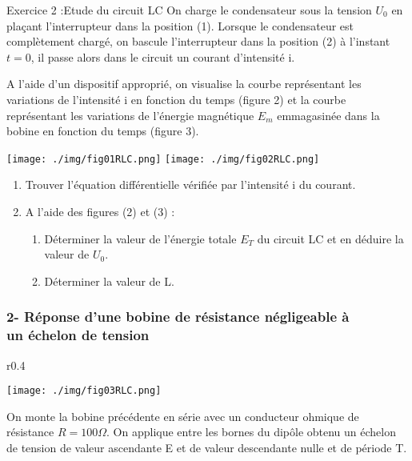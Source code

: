 \documentclass[12pt, french]{article}
\begin{document}
\begin{Box2}{Exercice 2 :Etude du circuit LC}
On charge le condensateur sous la tension $U_0$ en plaçant l'interrupteur dans la position (1).
Lorsque le condensateur est complètement chargé, on bascule l'interrupteur dans la position (2) à l'instant $t = 0$, il passe alors dans le circuit un courant d'intensité i.

A l'aide d'un dispositif approprié, on visualise la courbe représentant les variations de l'intensité i en fonction du temps (figure 2) et la courbe représentant les variations de l'énergie magnétique $E_m$ emmagasinée dans la bobine en fonction du temps (figure 3).
  \begin{center}
    \texttt{[image: ./img/fig01RLC.png]}
    \texttt{[image: ./img/fig02RLC.png]}
  \end{center}


\begin{enumerate}
  
  \item[1.1]  Trouver l'équation différentielle vérifiée par l'intensité i du courant.

  \item[1.2] A l'aide des figures (2) et (3) :
\begin{enumerate}
  \item[a-] Déterminer la valeur de l'énergie totale $E_T$ du circuit LC et en déduire la valeur de $U_0$.
  \item[b-] Déterminer la valeur de L.
\end{enumerate}

\end{enumerate}
\subsubsection*{2- Réponse d'une bobine de résistance négligeable à \\ un échelon de tension}

  \begin{wrapfigure}[4]{r}{0.4\textwidth}
  \vspace{-3.5cm}
  \begin{center}
    \texttt{[image: ./img/fig03RLC.png]}
  \end{center}
\end{wrapfigure}
On monte la bobine précédente en série avec un conducteur ohmique de résistance $R = 100 \Omega$. On applique entre les bornes du dipôle obtenu un échelon de tension de valeur ascendante E et de valeur descendante nulle et de période T.


\end{Box2}
\end{document}
